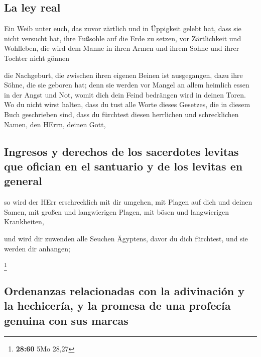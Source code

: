 \hypertarget{la-ley-real}{%
\subsection{La ley real}\label{la-ley-real}}

 Ein Weib unter euch, das zuvor zärtlich und in Üppigkeit
gelebt hat, dass sie nicht versucht hat, ihre Fußsohle auf die Erde zu
setzen, vor Zärtlichkeit und Wohlleben, die wird dem Manne in ihren
Armen und ihrem Sohne und ihrer Tochter nicht gönnen

 die Nachgeburt, die zwischen ihren eigenen Beinen ist
ausgegangen, dazu ihre Söhne, die sie geboren hat; denn sie werden vor
Mangel an allem heimlich essen in der Angst und Not, womit dich dein
Feind bedrängen wird in deinen Toren.  Wo du nicht wirst
halten, dass du tust alle Worte dieses Gesetzes, die in diesem Buch
geschrieben sind, dass du fürchtest diesen herrlichen und schrecklichen
Namen, den HErrn, deinen Gott,

\hypertarget{ingresos-y-derechos-de-los-sacerdotes-levitas-que-ofician-en-el-santuario-y-de-los-levitas-en-general}{%
\subsection{Ingresos y derechos de los sacerdotes levitas que ofician en
el santuario y de los levitas en
general}\label{ingresos-y-derechos-de-los-sacerdotes-levitas-que-ofician-en-el-santuario-y-de-los-levitas-en-general}}

 so wird der HErr erschrecklich mit dir umgehen, mit
Plagen auf dich und deinen Samen, mit großen und langwierigen Plagen,
mit bösen und langwierigen Krankheiten,

 und wird dir zuwenden alle Seuchen Ägyptens, davor du
dich fürchtest, und sie werden dir anhangen;

\footnote{\textbf{28:60} 5Mo 28,27}

\hypertarget{ordenanzas-relacionadas-con-la-adivinaciuxf3n-y-la-hechiceruxeda-y-la-promesa-de-una-profecuxeda-genuina-con-sus-marcas}{%
\subsection{Ordenanzas relacionadas con la adivinación y la hechicería,
y la promesa de una profecía genuina con sus
marcas}\label{ordenanzas-relacionadas-con-la-adivinaciuxf3n-y-la-hechiceruxeda-y-la-promesa-de-una-profecuxeda-genuina-con-sus-marcas}}

